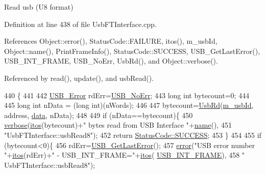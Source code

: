 Read usb (U8 format) 

Definition at line 438 of file Usb\+F\+T\+Interface.\+cpp.



References Object\+::error(), Status\+Code\+::\+F\+A\+I\+L\+U\+RE, itos(), m\+\_\+usb\+Id, Object\+::name(), Print\+Frame\+Info(), Status\+Code\+::\+S\+U\+C\+C\+E\+SS, U\+S\+B\+\_\+\+Get\+Last\+Error(), U\+S\+B\+\_\+\+I\+N\+T\+\_\+\+F\+R\+A\+ME, U\+S\+B\+\_\+\+No\+Err, Usb\+Rd(), and Object\+::verbose().



Referenced by read(), update(), and usb\+Read().


\begin{DoxyCode}
440                                                              \{
441   
442   \hyperlink{LALUsbML_8h_aa7e5a2302774d5aa1d48a2a1cfc46e86}{USB\_Error} rdErr=\hyperlink{LALUsbML_8h_ab44759ae95dd86cbc2855adf525c43cd}{USB\_NoErr};
443   \textcolor{keywordtype}{long} \textcolor{keywordtype}{int} bytecount=0;
444 
445   \textcolor{keywordtype}{long} \textcolor{keywordtype}{int} nData = (\textcolor{keywordtype}{long} int)(nWords);
446 
447   bytecount=\hyperlink{LALUsbML_8h_a613b00e83691d644c8d1cf05c499392b}{UsbRd}(\hyperlink{classUsbFTInterface_a91df5c0547e8be460bc087e27afe05aa}{m\_usbId}, address, \hyperlink{namespaceshell_a5ea2525995cedc3efd69ea8a7f034d1e}{data}, nData);
448 
449   \textcolor{keywordflow}{if} (nData==bytecount)\{
450     \hyperlink{classObject_a83d2db2df682907ea1115ad721c1c4a1}{verbose}(\hyperlink{Tools_8h_af330027dbdafb9a30768b3613c553e60}{itos}(bytecount)+\textcolor{stringliteral}{" bytes read from USB Interface "}+\hyperlink{classObject_a300f4c05dd468c7bb8b3c968868443c1}{name}(),
451             \textcolor{stringliteral}{"UsbFTInterface::usbRead8"});
452     \textcolor{keywordflow}{return} \hyperlink{classStatusCode_a6f565cbeadc76d14c72f047e5e85eb4badd0da38d3ba0d922efd1f4619bc37ad8}{StatusCode::SUCCESS};
453   \}
454 
455   \textcolor{keywordflow}{if} (bytecount<0)\{
456     rdErr=\hyperlink{LALUsbML_8h_a1662b77c9968848acf173f6f9c765ddd}{USB\_GetLastError}();
457     \hyperlink{classObject_a204a95f57818c0f811933917a30eff45}{error}(\textcolor{stringliteral}{"USB error number "}+\hyperlink{Tools_8h_af330027dbdafb9a30768b3613c553e60}{itos}(rdErr)+\textcolor{stringliteral}{" - USB\_INT\_FRAME="}+\hyperlink{Tools_8h_af330027dbdafb9a30768b3613c553e60}{itos}(
      \hyperlink{LALUsbML_8h_a68260f9cf3649507d12904cfa1592c11afd1c409187b1dfd3d66887a5e07e7ed3}{USB\_INT\_FRAME}),
458             \textcolor{stringliteral}{" UsbFTInterface::usbRead8"});

\end{DoxyCode}
